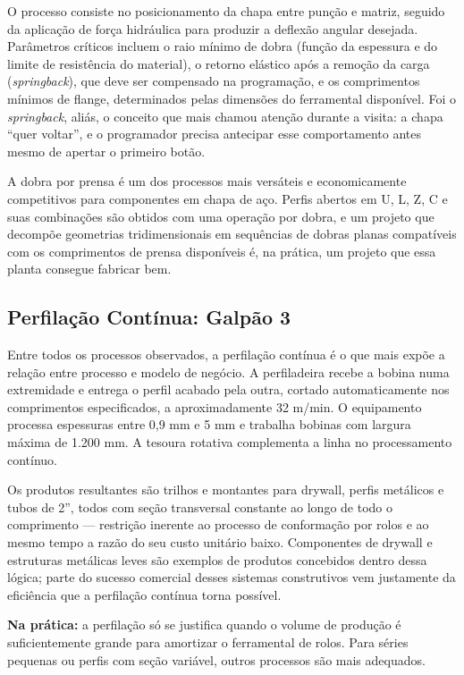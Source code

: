 \documentclass[12pt,a4paper,oneside,brazil,chapter=TITLE]{article}
\begin{document}
O processo consiste no posicionamento da chapa entre punção e matriz, seguido da aplicação de força hidráulica para produzir a deflexão angular desejada. Parâmetros críticos incluem o raio mínimo de dobra (função da espessura e do limite de resistência do material), o retorno elástico após a remoção da carga (\textit{springback}), que deve ser compensado na programação, e os comprimentos mínimos de flange, determinados pelas dimensões do ferramental disponível. Foi o \textit{springback}, aliás, o conceito que mais chamou atenção durante a visita: a chapa ``quer voltar'', e o programador precisa antecipar esse comportamento antes mesmo de apertar o primeiro botão.

A dobra por prensa é um dos processos mais versáteis e economicamente competitivos para componentes em chapa de aço. Perfis abertos em U, L, Z, C e suas combinações são obtidos com uma operação por dobra, e um projeto que decompõe geometrias tridimensionais em sequências de dobras planas compatíveis com os comprimentos de prensa disponíveis é, na prática, um projeto que essa planta consegue fabricar bem.

\subsection{Perfilação Contínua: Galpão 3}

Entre todos os processos observados, a perfilação contínua é o que mais expõe a relação entre processo e modelo de negócio. A perfiladeira recebe a bobina numa extremidade e entrega o perfil acabado pela outra, cortado automaticamente nos comprimentos especificados, a aproximadamente 32 m/min. O equipamento processa espessuras entre 0,9 mm e 5 mm e trabalha bobinas com largura máxima de 1.200 mm. A tesoura rotativa complementa a linha no processamento contínuo.

Os produtos resultantes são trilhos e montantes para drywall, perfis metálicos e tubos de 2'', todos com seção transversal constante ao longo de todo o comprimento — restrição inerente ao processo de conformação por rolos e ao mesmo tempo a razão do seu custo unitário baixo. Componentes de drywall e estruturas metálicas leves são exemplos de produtos concebidos dentro dessa lógica; parte do sucesso comercial desses sistemas construtivos vem justamente da eficiência que a perfilação contínua torna possível.

\textbf{Na prática:} a perfilação só se justifica quando o volume de produção é suficientemente grande para amortizar o ferramental de rolos. Para séries pequenas ou perfis com seção variável, outros processos são mais adequados.
\end{document}
